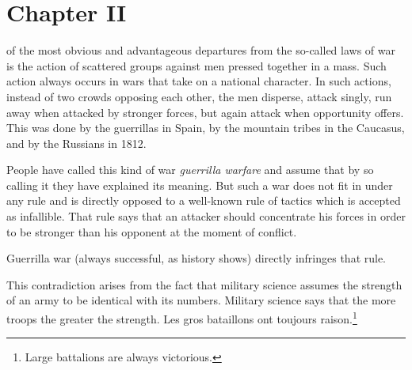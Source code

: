 
\chapter*{Chapter II} \ifaudio {}
\fi

 of the most obvious and advantageous departures from the
so-called laws of war is the action of scattered groups against
men pressed together in a mass. Such action always occurs in wars
that take on a national character. In such actions, instead of
two crowds opposing each other, the men disperse, attack singly,
run away when attacked by stronger forces, but again attack when
opportunity offers. This was done by the guerrillas in Spain, by
the mountain tribes in the Caucasus, and by the Russians in 1812.

People have called this kind of war \emph{guerrilla warfare} and
assume that by so calling it they have explained its meaning. But
such a war does not fit in under any rule and is directly opposed
to a well-known rule of tactics which is accepted as
infallible. That rule says that an attacker should concentrate
his forces in order to be stronger than his opponent at the
moment of conflict.

Guerrilla war (always successful, as history shows) directly
infringes that rule.

This contradiction arises from the fact that military science
assumes the strength of an army to be identical with its
numbers. Military science says that the more troops the greater
the strength. Les gros bataillons ont toujours
raison.\footnote{Large battalions are always victorious.}

